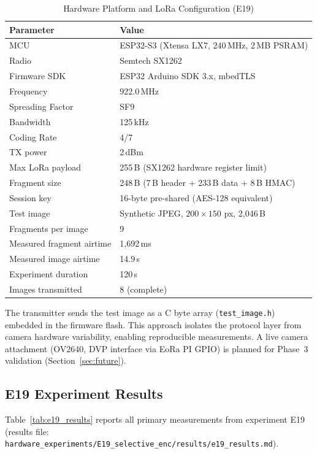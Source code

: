 \documentclass[journal]{IEEEtran}
\begin{document}
\begin{table}[ht]
\centering
\caption{Hardware Platform and LoRa Configuration (E19)}
\label{tab:platform}
\begin{tabular}{ll}
\toprule
Parameter & Value \\
\midrule
MCU & ESP32-S3 (Xtensa LX7, 240\,MHz, 2\,MB PSRAM) \\
Radio & Semtech SX1262 \\
Firmware SDK & ESP32 Arduino SDK 3.x, mbedTLS \\
Frequency & 922.0\,MHz \\
Spreading Factor & SF9 \\
Bandwidth & 125\,kHz \\
Coding Rate & 4/7 \\
TX power & 2\,dBm \\
Max LoRa payload & 255\,B (SX1262 hardware register limit) \\
Fragment size & 248\,B (7\,B header + 233\,B data + 8\,B HMAC) \\
Session key & 16-byte pre-shared (AES-128 equivalent) \\
Test image & Synthetic JPEG, $200\times150$ px, 2{,}046\,B \\
Fragments per image & 9 \\
Measured fragment airtime & 1{,}692\,ms \\
Measured image airtime & 14.9\,s \\
Experiment duration & 120\,s \\
Images transmitted & 8 (complete) \\
\bottomrule
\end{tabular}
\end{table}

The transmitter sends the test image as a C byte array (\texttt{test\_image.h})
embedded in the firmware flash.  This approach isolates the protocol layer from
camera hardware variability, enabling reproducible measurements.  A live camera
attachment (OV2640, DVP interface via EoRa PI GPIO) is planned for Phase~3
validation (Section~\ref{sec:future}).

\subsection{E19 Experiment Results}
\label{sec:e19}

Table~\ref{tab:e19_results} reports all primary measurements from experiment
E19 (results file: \texttt{hardware\_experiments/E19\_selective\_enc/results/e19\_results.md}).
\end{document}

